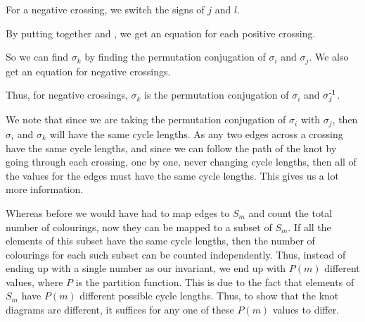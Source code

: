 \begin{paper}
\begin{paperwhere}
\end{paperwhere}

For a negative crossing, we switch the signs of $j$ and $l$.


By putting together \eqUpper and \eqPositive, we get an equation for each
positive crossing.


So we can find $\sigma_k$ by finding the permutation conjugation of $\sigma_i$
and $\sigma_j$.
We also get an equation for negative crossings.


Thus, for negative crossings, $\sigma_k$ is the permutation conjugation of
$\sigma_i$ and $\sigma_j^{\text-1}$.



\noindent{}

We note that since we are taking the permutation conjugation of $\sigma_i$ with
$\sigma_j$, then $\sigma_i$ and $\sigma_k$ will have the same cycle lengths.
As any two edges across a crossing have the same cycle lengths, and since we can
follow the path of the knot by going through each crossing, one by one, never
changing cycle lengths, then all of the values for the edges must have the same
cycle lengths.
This gives us a lot more information.

Whereas before we would have had to map edges to $S_m$ and count the total
number of colourings, now they can be mapped to a subset of $S_m$.
If all the elements of this subset have the same cycle lengths, then the number
of colourings for each such subset can be counted independently.
Thus, instead of ending up with a single number as our invariant, we end up with
$P(m)$ different values, where $P$ is the partition function.
This is due to the fact that elements of $S_m$ have $P(m)$ different possible
cycle lengths.
Thus, to show that the knot diagrams are different, it suffices for any one of
these $P(m)$ values to differ.


\end{paper}
